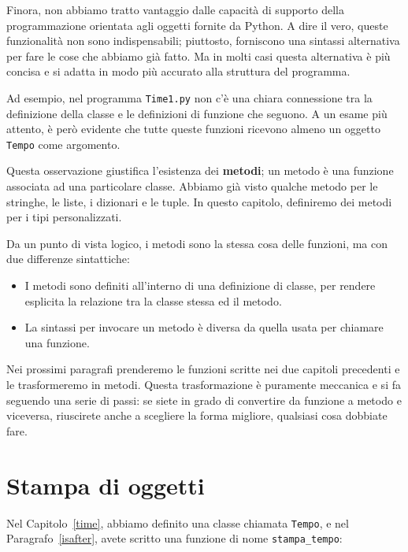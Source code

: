 \documentclass[10pt]{book}
\begin{document}
Finora, non abbiamo tratto vantaggio dalle capacità di supporto della   programmazione orientata agli oggetti fornite da Python. A dire il vero, queste funzionalità non sono indispensabili; piuttosto, forniscono una sintassi alternativa per fare le cose che abbiamo già fatto. Ma in molti casi questa alternativa è più concisa e si adatta in modo più accurato alla struttura del programma.

Ad esempio, nel programma {\tt Time1.py} non c'è una chiara connessione tra la definizione della classe e le definizioni di funzione che seguono. A un esame più attento, è però evidente che tutte queste funzioni ricevono almeno un oggetto {\tt Tempo} come argomento.

Questa osservazione giustifica l'esistenza dei {\bf metodi}; un metodo è una funzione associata ad una particolare classe. Abbiamo già visto qualche metodo per le stringhe, le liste, i dizionari e le tuple. In questo capitolo, definiremo dei metodi per i tipi personalizzati.

Da un punto di vista logico, i metodi sono la stessa cosa delle funzioni, ma con due differenze sintattiche:

\begin{itemize}

\item I metodi sono definiti all'interno di una definizione di classe, per      rendere esplicita la relazione tra la classe stessa ed il metodo.

\item La sintassi per invocare un metodo è diversa da quella usata per       chiamare una funzione.

\end{itemize}

Nei prossimi paragrafi prenderemo le funzioni scritte nei due capitoli    precedenti e le trasformeremo in metodi. Questa trasformazione è puramente meccanica e si fa seguendo una serie di passi: se siete in grado di convertire da funzione a metodo e viceversa, riuscirete anche a scegliere la forma migliore, qualsiasi cosa dobbiate fare.


\section{Stampa di oggetti}

Nel Capitolo~\ref{time}, abbiamo definito una classe chiamata
{\tt Tempo}, e nel Paragrafo~\ref{isafter}, avete scritto una funzione di nome \verb"stampa_tempo":
\end{document}
